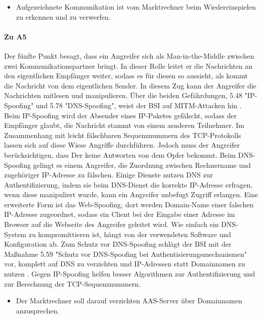 \documentclass[11pt,a4paper]{report}
\begin{document}
\begin{itemize}[leftmargin=*]
\item Aufgezeichnete Kommunikation ist vom Marktrechner beim Wiedereinspielen zu erkennen und zu verwerfen.
\end{itemize}

\paragraph{Zu A5} Der fünfte Punkt besagt, dass ein Angreifer sich als Man-in-the-Middle zwischen zwei Kommunikationspartner bringt. In dieser Rolle leitet er die Nachrichten an den eigentlichen Empfänger weiter, sodass es für diesen so aussieht, als kommt die Nachricht von dem eigentlichen Sender. In diesem Zug kann der Angreifer die Nachrichten mitlesen und manipulieren. Über die beiden Gefährdungen, 5.48 "IP-Spoofing" und 5.78 "DNS-Spoofing", weist der BSI auf MITM-Attacken hin \cite{bsi_g5048, bsi_g5078}. Beim IP-Spoofing wird der Absender eines IP-Paketes gefälscht, sodass der Empfänger glaubt, die Nachricht stammt von einem asnderen Teilnehmer. Im Zusammenhang mit leicht fälschbaren Sequenznummern des TCP-Protokolls lassen sich auf diese Wiese Angriffe durchführen. Jedoch muss der Angreifer berücksichtigen, dass Der keine Antworten von dem Opfer bekommt. Beim DNS-Spoofing gelingt es einem Angreifer, die Zuordnung zwischen Rechnername und zugehöriger IP-Adresse zu fälschen. Einige Dienste nutzen DNS zur Authentifizierung, indem sie beim DNS-Dienst die korrekte IP-Adresse erfragen, wenn diese manipuliert wurde, kann ein Angreifer unbefugt Zugriff erlangen. Eine erweiterte Form ist das Web-Spoofing, dort werden Domain-Name einer falschen IP-Adresse zugeordnet, sodass ein Client bei der Eingabe einer Adresse im Browser auf die Webseite des Angreifer geleitet wird. Wie einfach ein DNS-System zu kompromittieren ist, hängt von der verwendeten Software und Konfiguration ab. Zum Schutz vor DNS-Spoofing schlägt der BSI mit der Maßnahme 5.59 "Schutz vor DNS-Spoofing bei Authentisierungsmechanismen" vor, komplett auf DNS zu verzichten und IP-Adressen statt Domainnamen zu nutzen \cite{bsi_m5059}. Gegen IP-Spoofing helfen besser Algorithmen zur Authentifizierung und zur Berechnung der TCP-Sequenznummern.

\begin{itemize}[leftmargin=*]
\item Der Marktrechner soll darauf verzichten AAS-Server über Domainnamen anzusprechen.
\end{itemize}
\end{document}
